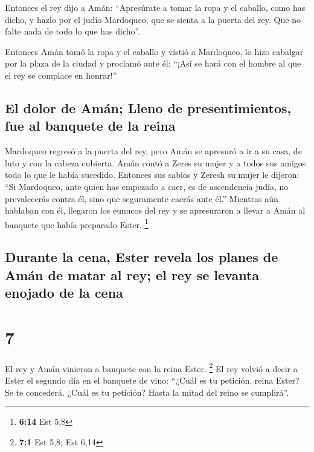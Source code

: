  Entonces el rey dijo a Amán: ``Apresúrate a tomar la
ropa y el caballo, como has dicho, y hazlo por el judío Mardoqueo, que
se sienta a la puerta del rey. Que no falte nada de todo lo que has
dicho''.

 Entonces Amán tomó la ropa y el caballo y vistió a
Mardoqueo, lo hizo cabalgar por la plaza de la ciudad y proclamó ante
él: ``¡Así se hará con el hombre al que el rey se complace en honrar!''

\hypertarget{el-dolor-de-amuxe1n-lleno-de-presentimientos-fue-al-banquete-de-la-reina}{%
\subsection{El dolor de Amán; Lleno de presentimientos, fue al banquete
de la
reina}\label{el-dolor-de-amuxe1n-lleno-de-presentimientos-fue-al-banquete-de-la-reina}}

 Mardoqueo regresó a la puerta del rey, pero Amán se
apresuró a ir a su casa, de luto y con la cabeza cubierta.
 Amán contó a Zeres su mujer y a todos sus amigos todo lo
que le había sucedido. Entonces sus sabios y Zeresh su mujer le dijeron:
``Si Mardoqueo, ante quien has empezado a caer, es de ascendencia judía,
no prevalecerás contra él, sino que seguramente caerás ante él.''
 Mientras aún hablaban con él, llegaron los eunucos del
rey y se apresuraron a llevar a Amán al banquete que había preparado
Ester. \footnote{\textbf{6:14} Est 5,8}

\hypertarget{durante-la-cena-ester-revela-los-planes-de-amuxe1n-de-matar-al-rey-el-rey-se-levanta-enojado-de-la-cena}{%
\subsection{Durante la cena, Ester revela los planes de Amán de matar al
rey; el rey se levanta enojado de la
cena}\label{durante-la-cena-ester-revela-los-planes-de-amuxe1n-de-matar-al-rey-el-rey-se-levanta-enojado-de-la-cena}}

\hypertarget{section-6}{%
\section{7}\label{section-6}}

 El rey y Amán vinieron a banquete con la reina Ester.
\footnote{\textbf{7:1} Est 5,8; Est 6,14}  El rey volvió a
decir a Ester el segundo día en el banquete de vino: ``¿Cuál es tu
petición, reina Ester? Se te concederá. ¿Cuál es tu petición? Hasta la
mitad del reino se cumplirá''.

